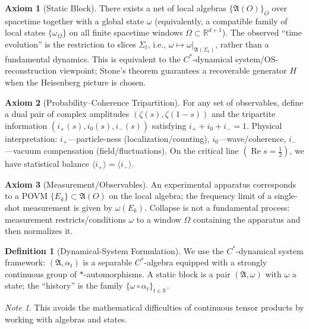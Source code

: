 \documentclass[11pt]{article}
\theoremstyle{definition}
\newtheorem{definition}[theorem]{Definition}
\newtheorem{axiom}{Axiom}
\theoremstyle{remark}
\newtheorem*{note}{Note}
\begin{document}
\begin{axiom}[Static Block]\label{ax:S}
There exists a net of local algebras \( \{\mathfrak{A}(O)\}_O \) over spacetime together with a global state \( \omega \) (equivalently, a compatible family of local states \( \{\omega_\Omega\} \) on all finite spacetime windows \( \Omega\subset\mathbb{R}^{d+1} \)). The observed ``time evolution'' is the restriction to slices \( \Sigma_t \), i.e., \( \omega\mapsto \omega|_{\mathfrak{A}(\Sigma_t)} \), rather than a fundamental dynamics. This is equivalent to the \( C^* \)-dynamical system/OS-reconstruction viewpoint; Stone's theorem guarantees a recoverable generator \( H \) when the Heisenberg picture is chosen.
\end{axiom}

\begin{axiom}[Probability--Coherence Tripartition]\label{ax:P}
For any set of observables, define a dual pair of complex amplitudes \( (\zeta(s),\zeta(1-s)) \) and the tripartite information \( (i_+(s), i_0(s), i_-(s)) \) satisfying \( i_+ + i_0 + i_- = 1 \). Physical interpretation: \( i_+ \)---particle-ness (localization/counting), \( i_0 \)---wave/coherence, \( i_- \)---vacuum compensation (field/fluctuations). On the critical line \( (\operatorname{Re}s=\tfrac{1}{2}) \), we have statistical balance \( \langle i_+\rangle = \langle i_-\rangle \).
\end{axiom}

\begin{axiom}[Measurement/Observables]\label{ax:M}
An experimental apparatus corresponds to a POVM \( \{E_k\}\subset\mathfrak{A}(O) \) on the local algebra; the frequency limit of a single-shot measurement is given by \( \omega(E_k) \). Collapse is not a fundamental process: measurement restricts/conditions \( \omega \) to a window \( \Omega \) containing the apparatus and then normalizes it.
\end{axiom}

\begin{definition}[Dynamical-System Formulation]\label{def:dynamical}
We use the \( C^* \)-dynamical system framework: \( (\mathfrak{A},\alpha_t) \) is a separable \( C^* \)-algebra equipped with a strongly continuous group of \( * \)-automorphisms. A static block is a pair \( (\mathfrak{A},\omega) \) with \( \omega \) a state; the ``history'' is the family \( \{\omega\circ\alpha_t\}_{t\in\mathbb{R}} \).
\end{definition}

\begin{note}
This avoids the mathematical difficulties of continuous tensor products by working with algebras and states.
\end{note}
\end{document}
